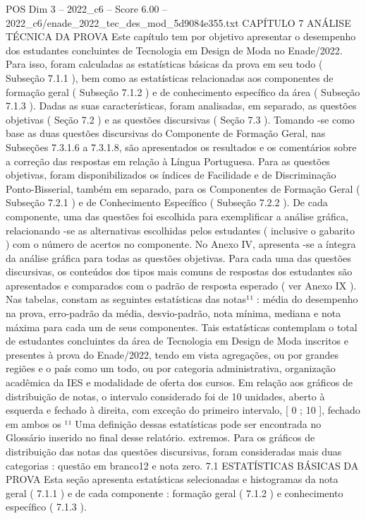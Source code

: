 \begin{textsample}{POS Dim 3 – 2022\_c6 – Score 6.00 – 2022\_c6/enade\_2022\_tec\_des\_mod\_5d9084e355.txt}  \label{ex:f3_pos_027}
CAPÍTULO 7 ANÁLISE TÉCNICA DA PROVA Este capítulo tem por objetivo apresentar o desempenho dos estudantes concluintes de Tecnologia em Design de Moda no Enade/2022.
Para isso, foram calculadas as estatísticas básicas da prova em seu todo ( Subseção 7.1.1 ), bem como as estatísticas relacionadas aos componentes de formação geral ( Subseção 7.1.2 ) e de conhecimento específico da área ( Subseção 7.1.3 ).
Dadas as suas características, foram analisadas, em separado, as questões objetivas ( Seção 7.2 ) e as questões discursivas ( Seção 7.3 ).
Tomando -se como base as duas questões discursivas do Componente de Formação Geral, nas Subseções 7.3.1.6 a 7.3.1.8, são apresentados os resultados e os comentários sobre a correção das respostas em relação à Língua Portuguesa.
Para as questões objetivas, foram disponibilizados os índices de Facilidade e de Discriminação Ponto-Bisserial, também em separado, para os Componentes de Formação Geral ( Subseção 7.2.1 ) e de Conhecimento Específico ( Subseção 7.2.2 ).
De cada componente, uma das questões foi escolhida para exemplificar a análise gráfica, relacionando -se as alternativas escolhidas pelos estudantes ( inclusive o gabarito ) com o número de acertos no componente.
No Anexo IV, apresenta -se a íntegra da análise gráfica para todas as questões objetivas.
Para cada uma das questões discursivas, os conteúdos dos tipos mais comuns de respostas dos estudantes são apresentados e comparados com o padrão de resposta esperado ( ver Anexo IX ).
Nas tabelas, constam as seguintes estatísticas das notas¹¹ : média do desempenho na prova, erro-padrão da média, desvio-padrão, nota mínima, mediana e nota máxima para cada um de seus componentes.
Tais estatísticas contemplam o total de estudantes concluintes da área de Tecnologia em Design de Moda inscritos e presentes à prova do Enade/2022, tendo em vista agregações, ou por grandes regiões e o país como um todo, ou por categoria administrativa, organização acadêmica da IES e modalidade de oferta dos cursos.
Em relação aos gráficos de distribuição de notas, o intervalo considerado foi de 10 unidades, aberto à esquerda e fechado à direita, com exceção do primeiro intervalo, [ 0 ; 10 ], fechado em ambos os ¹¹ Uma definição dessas estatísticas pode ser encontrada no Glossário inserido no final desse relatório. extremos.
Para os gráficos de distribuição das notas das questões discursivas, foram consideradas mais duas categorias : questão em branco12 e nota zero. 7.1 ESTATÍSTICAS BÁSICAS DA PROVA Esta seção apresenta estatísticas selecionadas e histogramas da nota geral ( 7.1.1 ) e de cada componente : formação geral ( 7.1.2 ) e conhecimento específico ( 7.1.3 ).

\end{textsample}
